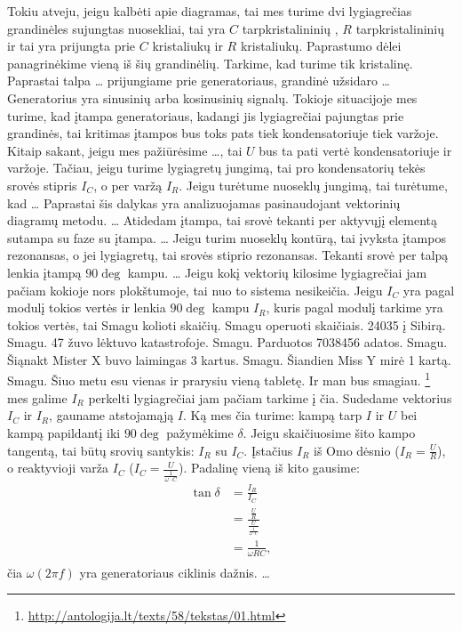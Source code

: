 Tokiu atveju, jeigu kalbėti apie diagramas, tai mes turime dvi
lygiagrečias grandinėles sujungtas nuosekliai, tai yra $C$
tarpkristalininių , $R$ tarpkristalininių 
ir tai yra prijungta prie $C$ kristaliukų ir $R$ kristaliukų.
Paprastumo dėlei panagrinėkime vieną iš šių grandinėlių. Tarkime,
kad turime tik kristalinę. Paprastai talpa … prijungiame prie
generatoriaus, grandinė užsidaro … Generatorius yra sinusinių
arba kosinusinių signalų. Tokioje situacijoje mes turime, kad
įtampa generatoriaus, kadangi jis lygiagrečiai pajungtas prie
grandinės, tai kritimas įtampos bus toks pats tiek kondensatoriuje
tiek varžoje. Kitaip sakant, jeigu mes pažiūrėsime …, tai $U$
bus ta pati vertė kondensatoriuje ir varžoje. Tačiau, jeigu
turime lygiagretų jungimą, tai pro kondensatorių tekės srovės
stipris $I_{C}$, o per varžą $I_{R}$.  Jeigu turėtume nuoseklų
jungimą, tai turėtume, kad … Paprastai šis dalykas yra
analizuojamas pasinaudojant vektorinių diagramų metodu.
… Atidedam įtampa, tai srovė tekanti per aktyvųjį elementą sutampa
su faze su įtampa.  …
Jeigu turim nuoseklų kontūrą, tai įvyksta įtampos rezonansas,
o jei lygiagretų, tai srovės stiprio rezonansas. Tekanti
srovė per talpą lenkia įtampą $90\deg$ kampu. … Jeigu kokį
vektorių kilosime lygiagrečiai jam pačiam kokioje nors plokštumoje, tai
nuo to sistema nesikeičia. Jeigu $I_{C}$ yra pagal modulį tokios
vertės ir lenkia $90\deg$ kampu $I_{R}$, kuris pagal modulį
tarkime yra tokios vertės, tai {
  Smagu kolioti skaičių. Smagu operuoti
  skaičiais. 24035 į Sibirą. Smagu. 47 žuvo lėktuvo katastrofoje.
  Smagu. Parduotos 7038456 adatos. Smagu. Šiąnakt Mister X buvo
  laimingas 3 kartus. Smagu. Šiandien Miss Y mirė 1 kartą. Smagu. Šiuo
  metu esu vienas ir prarysiu vieną tabletę. Ir man bus smagiau.}%
\footnote{\url{http://antologija.lt/texts/58/tekstas/01.html}}
mes galime $I_{R}$ perkelti lygiagrečiai jam pačiam tarkime į čia.
Sudedame vektorius $I_{C}$ ir $I_{R}$, gauname atstojamąją $I$.
Ką mes čia turime: kampą tarp $I$ ir $U$ bei kampą papildantį iki
$90\deg$ pažymėkime $\delta$. Jeigu skaičiuosime šito kampo tangentą,
tai būtų srovių santykis: $I_{R}$ su $I_{C}$. Įstačius $I_{R}$
iš Omo dėsnio ($I_{R} = \frac{U}{R}$), o reaktyvioji varža $I_{C}$
($I_{C} = \frac{U}{\frac{1}{\omega \cdot C}}$). Padalinę vieną
iš kito gausime:
\begin{align*}
  \tan \delta
  &= \frac{I_{R}}{I_{C}} \\
  &= \frac{\frac{U}{R}}{\frac{U}{\frac{1}{\omega \cdot C}}} \\
  &= \frac{1}{\omega R C}, \\
\end{align*}
čia $\omega (2 \pi f)$ yra generatoriaus ciklinis dažnis. …

